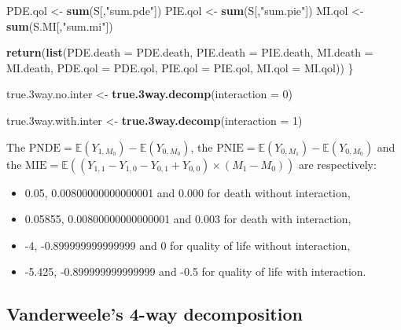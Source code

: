 \documentclass[
]{book}
\newenvironment{Shaded}{\begin{snugshade}}{\end{snugshade}}
\newcommand{\AttributeTok}[1]{\textcolor[rgb]{0.13,0.29,0.53}{#1}}
\newcommand{\DecValTok}[1]{\textcolor[rgb]{0.00,0.00,0.81}{#1}}
\newcommand{\FloatTok}[1]{\textcolor[rgb]{0.00,0.00,0.81}{#1}}
\newcommand{\FunctionTok}[1]{\textcolor[rgb]{0.13,0.29,0.53}{\textbf{#1}}}
\newcommand{\NormalTok}[1]{#1}
\newcommand{\OtherTok}[1]{\textcolor[rgb]{0.56,0.35,0.01}{#1}}
\newcommand{\StringTok}[1]{\textcolor[rgb]{0.31,0.60,0.02}{#1}}
\providecommand{\tightlist}{%
  \setlength{\itemsep}{0pt}\setlength{\parskip}{0pt}}
\begin{document}
\begin{Shaded}
\begin{Highlighting}[]
\NormalTok{  PDE.qol }\OtherTok{\textless{}{-}} \FunctionTok{sum}\NormalTok{(S[,}\StringTok{"sum.pde"}\NormalTok{])}
\NormalTok{  PIE.qol }\OtherTok{\textless{}{-}} \FunctionTok{sum}\NormalTok{(S[,}\StringTok{"sum.pie"}\NormalTok{])}
\NormalTok{  MI.qol }\OtherTok{\textless{}{-}} \FunctionTok{sum}\NormalTok{(S.MI[,}\StringTok{"sum.mi"}\NormalTok{])}
  
  \FunctionTok{return}\NormalTok{(}\FunctionTok{list}\NormalTok{(}\AttributeTok{PDE.death =}\NormalTok{ PDE.death, }\AttributeTok{PIE.death =}\NormalTok{ PIE.death, }\AttributeTok{MI.death =}\NormalTok{ MI.death,}
              \AttributeTok{PDE.qol =}\NormalTok{ PDE.qol, }\AttributeTok{PIE.qol =}\NormalTok{ PIE.qol, }\AttributeTok{MI.qol =}\NormalTok{ MI.qol))}
\NormalTok{\}}
\end{Highlighting}
\end{Shaded}

\begin{Shaded}
\begin{Highlighting}[]
\NormalTok{true}\FloatTok{.3}\NormalTok{way.no.inter }\OtherTok{\textless{}{-}} \FunctionTok{true.3way.decomp}\NormalTok{(}\AttributeTok{interaction =} \DecValTok{0}\NormalTok{)}

\NormalTok{true}\FloatTok{.3}\NormalTok{way.with.inter }\OtherTok{\textless{}{-}} \FunctionTok{true.3way.decomp}\NormalTok{(}\AttributeTok{interaction =} \DecValTok{1}\NormalTok{)}
\end{Highlighting}
\end{Shaded}

The \(\text{PNDE}=\mathbb{E}\left( Y_{1,M_0}\right) - \mathbb{E}\left( Y_{0,M_0}\right)\), the \(\text{PNIE}=\mathbb{E}\left(Y_{0,M_1}\right) - \mathbb{E}\left(Y_{0,M_0}\right)\) and the \(\text{MIE}=\mathbb{E}\left( (Y_{1,1} - Y_{1,0} - Y_{0,1} + Y_{0,0}) \times (M_1 - M_0) \right)\) are respectively:

\begin{itemize}
\tightlist
\item
  0.05, 0.00800000000000001 and 0.000 for death without interaction,
\item
  0.05855, 0.00800000000000001 and 0.003 for death with interaction,
\item
  -4, -0.899999999999999 and 0 for quality of life without interaction,
\item
  -5.425, -0.899999999999999 and -0.5 for quality of life with interaction.
\end{itemize}

\hypertarget{vanderweeles-4-way-decomposition}{%
\subsection{Vanderweele's 4-way decomposition}\label{vanderweeles-4-way-decomposition}}
\end{document}
